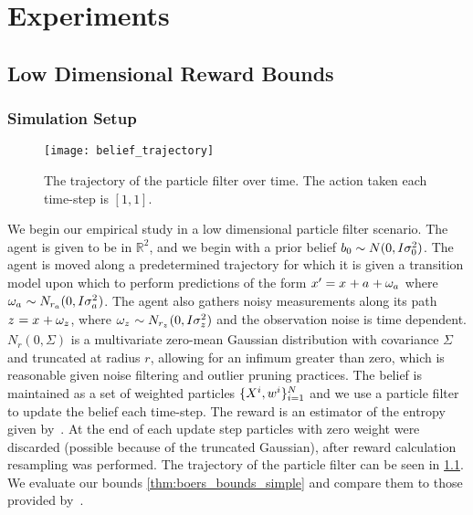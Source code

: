 \chapter{Experiments}
\section{Low Dimensional Reward Bounds}
\subsection{Simulation Setup}
\begin{figure}[h]
	\centering
	\texttt{[image: belief\_trajectory]}
	\caption{The trajectory of the particle filter over time. The action taken each time-step is $[1,1]$.}
	\label{fig:belief_trajectory}
\end{figure}
	We begin our empirical study in a low dimensional particle filter scenario. The agent is given to be in $\mathbb{R}^2$, and we begin with a prior belief $b_{0}\sim N(0,I\sigma_0^2)$. The agent is moved along a predetermined trajectory for which it is given a transition model upon which to perform predictions of the form $x_{}^\prime=x_{}+{a_{}}+\omega_{{a_{}}}$ where $\omega_{{a_{}}}\sim N_{r_a}(0,I\sigma_{{a_{}}}^2)$. The agent also gathers noisy measurements along its path $z_{}^{}=x_{}+\omega_{z_{}^{}}$, where $\omega_{z_{}^{}}\sim N_{r_{z_{}^{}}}(0,I\sigma_{z_{}^{}}^2)$ and the observation noise is time dependent. $N_{r}(0,\Sigma)$ is a multivariate zero-mean Gaussian distribution with covariance $\Sigma$ and truncated at radius $r$, allowing for an infimum greater than zero, which is reasonable given noise filtering and outlier pruning practices. The belief is maintained as a set of weighted particles $\{X_{}^i,w_{}^{i}\}_{i=1}^N$ and we use a particle filter to update the belief each time-step. The reward is an estimator of the entropy given by~\cite{Boers10fusion}. At the end of each update step particles with zero weight were discarded (possible because of the truncated Gaussian), after reward calculation resampling was performed. The trajectory of the particle filter can be seen in \cref{fig:belief_trajectory}. We evaluate our bounds \autoref{thm:boers_bounds_simple} and compare them to those provided by~\cite{Sztyglic22iros}.
